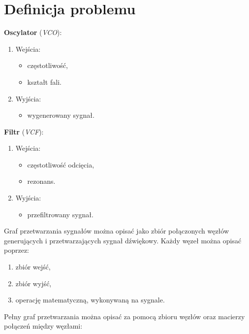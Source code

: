 \chapter{Definicja problemu}\label{chap:problem_definition}

\begin{multicols}{2}
\noindent
\textbf{Oscylator} (\textit{VCO}):
\begin{enumerate}
  \item Wejścia:
    \begin{itemize}
      \item częstotliwość,
      \item kształt fali.
    \end{itemize}
  \item Wyjścia:
    \begin{itemize}
      \item wygenerowany sygnał.
    \end{itemize}
\end{enumerate}

\noindent
\textbf{Filtr} (\textit{VCF}):
\begin{enumerate}
  \item Wejścia:
    \begin{itemize}
      \item częstotliwość odcięcia,
      \item rezonans.
    \end{itemize}
  \item Wyjścia:
    \begin{itemize}
      \item przefiltrowany sygnał.
    \end{itemize}
\end{enumerate}
\end{multicols}

Graf przetwarzania sygnałów można opisać jako zbiór połączonych węzłów generujących
i przetwarzających sygnał dźwiękowy. Każdy węzeł można opisać poprzez:

\begin{enumerate}
  \item zbiór wejść,
  \item zbiór wyjść,
  \item operację matematyczną, wykonywaną na sygnale.
\end{enumerate}

Pełny graf przetwarzania można opisać za pomocą zbioru węzłów oraz
macierzy połączeń między węzłami:

